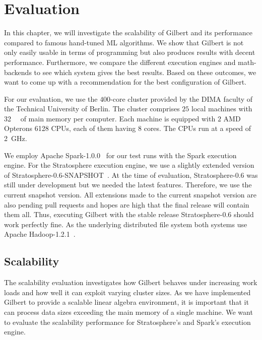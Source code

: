 \chapter{Evaluation}
\label{cha:evaluation}


In this chapter, we will investigate the scalability of Gilbert and its performance compared to famous hand-tuned ML algorithms.
We show that Gilbert is not only easily usable in terms of programming but also produces results with decent performance.
Furthermore, we compare the different execution engines and math-backends to see which system gives the best results.
Based on these outcomes, we want to come up with a recommendation for the best configuration of Gilbert.

For our evaluation, we use the $400$-core cluster provided by the DIMA faculty of the Technical University of Berlin.
The cluster comprises $25$ local machines with \SI{32}{\giga\byte} of main memory per computer.
Each machine is equipped with $2$ AMD Opterons 6128 CPUs, each of them having $8$ cores.
The CPUs run at a speed of \SI{2}{\giga\hertz}.

We employ Apache Spark-1.0.0~\cite{spark} for our test runs with the Spark execution engine.
For the Stratosphere execution engine, we use a slightly extended version of Stratosphere-0.6-SNAPSHOT~\cite{stratosphere}.
At the time of evaluation, Stratosphere-0.6 was still under development but we needed the latest features.
Therefore, we use the current snapshot version.
All extensions made to the current snapshot version are also pending pull requests and hopes are high that the final release will contain them all.
Thus, executing Gilbert with the stable release Stratosphere-0.6 should work perfectly fine.
As the underlying distributed file system both systems use Apache Hadoop-1.2.1~\cite{hadoop:2008a}.

\section{Scalability}

The scalability evaluation investigates how Gilbert behaves under increasing work loads and how well it can exploit varying cluster sizes.
As we have implemented Gilbert to provide a scalable linear algebra environment, it is important that it can process data sizes exceeding the main memory of a single machine.
We want to evaluate the scalability performance for Stratosphere's and Spark's execution engine.

